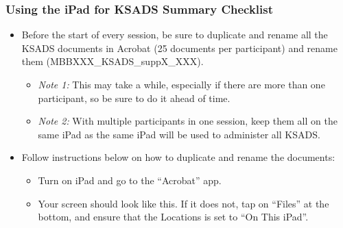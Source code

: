 \documentclass[]{book}
\providecommand{\tightlist}{%
  \setlength{\itemsep}{0pt}\setlength{\parskip}{0pt}}
\begin{document}
\hypertarget{using-the-ipad-for-ksads-summary-checklist}{%
\subsubsection{Using the iPad for KSADS Summary Checklist}\label{using-the-ipad-for-ksads-summary-checklist}}

\begin{itemize}
\tightlist
\item
  Before the start of every session, be sure to duplicate and rename all the KSADS documents in Acrobat (25 documents per participant) and rename them (MBBXXX\_KSADS\_suppX\_XXX).

  \begin{itemize}
  \tightlist
  \item
    \emph{Note 1:} This may take a while, especially if there are more than one participant, so be sure to do it ahead of time.
  \item
    \emph{Note 2:} With multiple participants in one session, keep them all on the same iPad as the same iPad will be used to administer all KSADS.
  \end{itemize}
\item
  Follow instructions below on how to duplicate and rename the documents:

  \begin{itemize}
  \item
    Turn on iPad and go to the ``Acrobat'' app.
  \item
    Your screen should look like this. If it does not, tap on ``Files'' at the bottom, and ensure that the Locations is set to ``On This iPad''.


\end{itemize}
\end{itemize}
\end{document}
